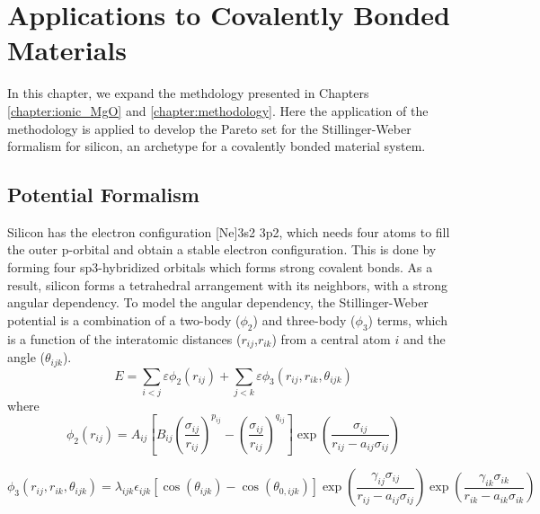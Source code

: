 \chapter{Applications to Covalently Bonded Materials}
\label{ch:pareto_si}

In this chapter, we expand the methdology presented in Chapters \ref{chapter:ionic_MgO} and \ref{chapter:methodology}.  Here the application of the methodology is applied to develop the Pareto set for the Stillinger-Weber formalism\cite{stillinger1985_sw} for silicon, an archetype for a covalently bonded material system.

\section{Potential Formalism}
Silicon has the electron configuration [Ne]3s2 3p2, which needs four atoms to fill the outer p-orbital and obtain a stable electron configuration.  This is done by forming four sp3-hybridized orbitals which forms strong covalent bonds.  As a result, silicon forms a tetrahedral arrangement with its neighbors, with a strong angular dependency.  To model the angular dependency, the Stillinger-Weber potential\cite{stillinger1985_sw} is a combination of a two-body ($\phi_2$) and three-body ($\phi_3$) terms, which is a function of the interatomic distances ($r_{ij}$,$r_{ik}$) from a central atom $i$ and the angle ($\theta_{ijk}$).
\begin{equation}
    E = \sum_{i<j}\varepsilon \phi_2 (r_{ij})
        +\sum_{j<k}\varepsilon \phi_3 (r_{ij},r_{ik},\theta_{ijk})
\end{equation}
where
\begin{equation}
    \phi_2(r_{ij})=A_{ij} \left[
        B_{ij}
        \left(\frac{\sigma_{ij}}{r_{ij}}\right)^{p_{ij}}
        - \left(\frac{\sigma_{ij}}{r_{ij}}\right)^{q_{ij}}
    \right]
    \exp\left(\frac{\sigma_{ij}}{r_{ij}-a_{ij}\sigma_{ij}}\right)
\end{equation}

\begin{equation}
    \phi_3(r_{ij},r_{ik},\theta_{ijk}) =
        \lambda_{ijk}
        \epsilon_{ijk}
        \left[
            \cos(\theta_{ijk}) - \cos(\theta_{0,ijk})
        \right]
        \exp\left(\frac{\gamma_{ij}\sigma_{ij}}
                       {r_{ij}-a_{ij}\sigma_{ij}}
            \right)
        \exp\left(\frac{\gamma_{ik}\sigma_{ik}}
                       {r_{ik}-a_{ik}\sigma_{ik}}
            \right)
\end{equation}

